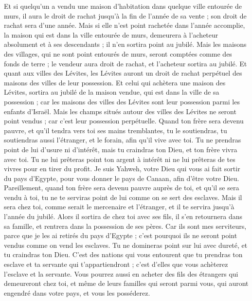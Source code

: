 \begin{multicols}{2}
Et si quelqu'un a vendu une maison d'habitation dans quelque ville entourée de murs, il aura le droit de rachat jusqu'à la fin de l'année de sa vente ; son droit de rachat sera d'une année.
Mais si elle n'est point rachetée dans l'année accomplie, la maison qui est dans la ville entourée de murs, demeurera à l'acheteur absolument et à ses descendants ; il n'en sortira point au jubilé.
Mais les maisons des villages, qui ne sont point entourés de murs, seront comptées comme des fonds de terre ; le vendeur aura droit de rachat, et l'acheteur sortira au jubilé.
Et quant aux villes des Lévites, les Lévites auront un droit de rachat perpétuel des maisons des villes de leur possession.
Et celui qui achètera une maison des Lévites, sortira au jubilé de la maison vendue, qui est dans la ville de sa possession ; car les maisons des villes des Lévites sont leur possession parmi les enfants d'Israël.
Mais les champs situés autour des villes des Lévites ne seront point vendus ; car c'est leur possession perpétuelle.
Quand ton frère sera devenu pauvre, et qu'il tendra vers toi ses mains tremblantes, tu le soutiendras, tu soutiendras aussi l'étranger, et le forain, afin qu'il vive avec toi.
Tu ne prendras point de lui d'usure ni d'intérêt, mais tu craindras ton Dieu, et ton frère vivra avec toi.
Tu ne lui prêteras point ton argent à intérêt ni ne lui prêteras de tes vivres pour en tirer du profit.
Je suis Yahweh, votre Dieu qui vous ai fait sortir du pays d'Egypte, pour vous donner le pays de Canaan, afin d'être votre Dieu.
Pareillement, quand ton frère sera devenu pauvre auprès de toi, et qu'il se sera vendu à toi, tu ne te serviras point de lui comme on se sert des esclaves.
Mais il sera chez toi, comme serait le mercenaire et l'étranger, et il te servira jusqu'à l'année du jubilé.
Alors il sortira de chez toi avec ses fils, il s'en retournera dans sa famille, et rentrera dans la possession de ses pères.
Car ils sont mes serviteurs, parce que je les ai retirés du pays d'Egypte ; c'est pourquoi ils ne seront point vendus comme on vend les esclaves.
Tu ne domineras point sur lui avec dureté, et tu craindras ton Dieu.
C'est des nations qui vous entourent que tu prendras ton esclave et ta servante qui t'appartiendront ; c'est d'elles que vous achèterez l'esclave et la servante.
Vous pourrez aussi en acheter des fils des étrangers qui demeureront chez toi, et même de leurs familles qui seront parmi vous, qui auront engendré dans votre pays, et vous les posséderez.

\end{multicols}
